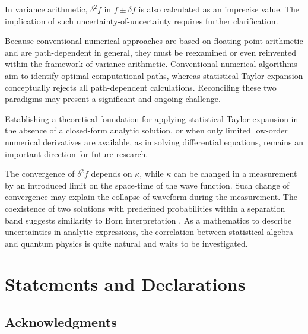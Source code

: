 \documentclass[twoside]{article}
\numberwithin{equation}{section}
\begin{document}
In variance arithmetic, $\delta^2 f$ in $f \pm \delta f$ is also calculated as an imprecise value.
The implication of such uncertainty-of-uncertainty requires further clarification.

Because conventional numerical approaches are based on floating-point arithmetic and are path-dependent in general, they must be reexamined or even reinvented within the framework of variance arithmetic.
Conventional numerical algorithms aim to identify optimal computational paths, whereas statistical Taylor expansion conceptually rejects all path-dependent calculations.
Reconciling these two paradigms may present a significant and ongoing challenge.

Establishing a theoretical foundation for applying statistical Taylor expansion in the absence of a closed-form analytic solution, or when only limited low-order numerical derivatives are available, as in solving differential equations, remains an important direction for future research.

The convergence of $\delta^2 f$ depends on $\kappa$, while $\kappa$ can be changed in a measurement by an introduced limit on the space-time of the wave function.
Such change of convergence may explain the collapse of waveform during the measurement.
The coexistence of two solutions with predefined probabilities within a separation band suggests similarity to Born interpretation \cite{Quantum_Mechanics}.
As a mathematics to describe uncertainties in analytic expressions, the correlation between statistical algebra and quantum physics is quite natural and waits to be investigated. 





\ifdefined\NoAuthor
\else
\section{Statements and Declarations}

\subsection{Acknowledgments}
\end{document}
